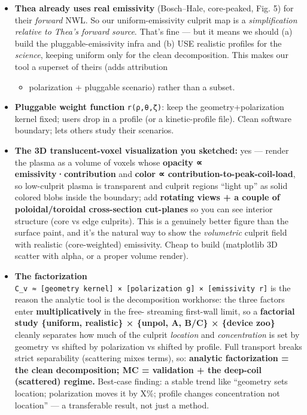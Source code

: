 \documentclass[
]{article}
\providecommand{\tightlist}{%
  \setlength{\itemsep}{0pt}\setlength{\parskip}{0pt}}
\begin{document}
\begin{itemize}
\tightlist
\item
  \textbf{Thea already uses real emissivity} (Bosch--Hale, core-peaked,
  Fig. 5) for their \emph{forward} NWL. So our uniform-emissivity
  culprit map is a \emph{simplification relative to Thea's forward
  source}. That's fine --- but it means we should (a) build the
  pluggable-emissivity infra and (b) USE realistic profiles for the
  \emph{science}, keeping uniform only for the clean decomposition. This
  makes our tool a superset of theirs (adds attribution

  \begin{itemize}
  \tightlist
  \item
    polarization + pluggable scenario) rather than a subset.
  \end{itemize}
\item
  \textbf{Pluggable weight function} \texttt{r(ρ,θ,ζ)}: keep the
  geometry+polarization kernel fixed; users drop in a profile (or a
  kinetic-profile file). Clean software boundary; lets others study
  their scenarios.
\item
  \textbf{The 3D translucent-voxel visualization you sketched:} yes ---
  render the plasma as a volume of voxels whose \textbf{opacity ∝
  emissivity·contribution} and \textbf{color ∝
  contribution-to-peak-coil-load}, so low-culprit plasma is transparent
  and culprit regions ``light up'' as solid colored blobs inside the
  boundary; add \textbf{rotating views + a couple of poloidal/toroidal
  cross-section cut-planes} so you can see interior structure (core vs
  edge culprits). This is a genuinely better figure than the surface
  paint, and it's the natural way to show the \emph{volumetric} culprit
  field with realistic (core-weighted) emissivity. Cheap to build
  (matplotlib 3D scatter with alpha, or a proper volume render).
\item
  \textbf{The factorization}
  \texttt{C\_v\ ≈\ {[}geometry\ kernel{]}\ ×\ {[}polarization\ g{]}\ ×\ {[}emissivity\ r{]}}
  is the reason the analytic tool is the decomposition workhorse: the
  three factors enter \textbf{multiplicatively} in the free- streaming
  first-wall limit, so a \textbf{factorial study \{uniform, realistic\}
  × \{unpol, A, B/C\} × \{device zoo\}} cleanly separates how much of
  the culprit \emph{location} and \emph{concentration} is set by
  geometry vs shifted by polarization vs shifted by profile. Full
  transport breaks strict separability (scattering mixes terms), so:
  \textbf{analytic factorization = the clean decomposition; MC =
  validation + the deep-coil (scattered) regime.} Best-case finding: a
  stable trend like ``geometry sets location; polarization moves it by
  X\%; profile changes concentration not location'' --- a transferable
  result, not just a method.
\end{itemize}
\end{document}
